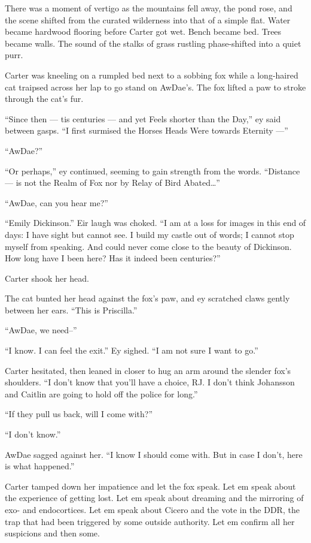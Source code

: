 There was a moment of vertigo as the mountains fell away, the pond rose, and the scene shifted from the curated wilderness into that of a simple flat. Water became hardwood flooring before Carter got wet. Bench became bed. Trees became walls. The sound of the stalks of grass rustling phase-shifted into a quiet purr.

Carter was kneeling on a rumpled bed next to a sobbing fox while a long-haired cat traipsed across her lap to go stand on AwDae's. The fox lifted a paw to stroke through the cat's fur.

``Since then — tis centuries — and yet Feels shorter than the Day,'' ey said between gasps. ``I first surmised the Horses Heads Were towards Eternity —''

``AwDae?''

``Or perhaps,'' ey continued, seeming to gain strength from the words. ``Distance — is not the Realm of Fox nor by Relay of Bird Abated\ldots{}''

``AwDae, can you hear me?''

``Emily Dickinson.'' Eir laugh was choked. ``I am at a loss for images in this end of days: I have sight but cannot see. I build my castle out of words; I cannot stop myself from speaking. And could never come close to the beauty of Dickinson. How long have I been here? Has it indeed been centuries?''

Carter shook her head.

The cat bunted her head against the fox's paw, and ey scratched claws gently between her ears. ``This is Priscilla.''

``AwDae, we need--''

``I know. I can feel the exit.'' Ey sighed. ``I am not sure I want to go.''

Carter hesitated, then leaned in closer to hug an arm around the slender fox's shoulders. ``I don't know that you'll have a choice, RJ. I don't think Johansson and Caitlin are going to hold off the police for long.''

``If they pull us back, will I come with?''

``I don't know.''

AwDae sagged against her. ``I know I should come with. But in case I don't, here is what happened.''

Carter tamped down her impatience and let the fox speak. Let em speak about the experience of getting lost. Let em speak about dreaming and the mirroring of exo- and endocortices. Let em speak about Cicero and the vote in the DDR, the trap that had been triggered by some outside authority. Let em confirm all her suspicions and then some.

